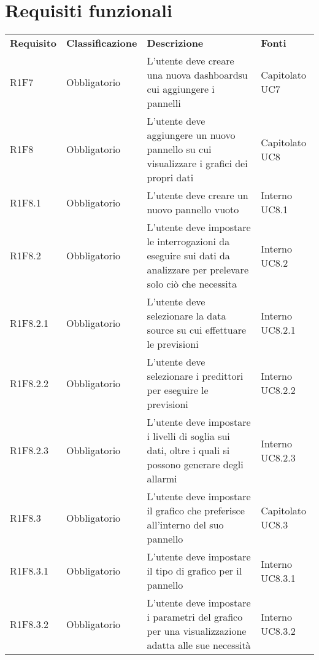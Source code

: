 \section{Requisiti funzionali}
\begin{longtable} {
		>{\centering}p{18mm} 
		>{\centering}p{28mm}
		>{}p{50mm} 
		>{}p{28mm}
	}
	\rowcolor{gray!50}

		\textbf{Requisito} & \textbf{Classificazione} & \textbf{Descrizione} & \textbf{Fonti} 	\TBstrut \\

		R1F7 & Obbligatorio & L'utente deve creare una nuova dashboard\glosp su cui aggiungere i pannelli & Capitolato UC7 \TBstrut \\ [2mm]

		R1F8 & Obbligatorio & L'utente deve aggiungere un nuovo pannello su cui visualizzare i grafici dei propri dati & Capitolato UC8 \TBstrut \\ [2mm]

		R1F8.1 & Obbligatorio & L'utente deve creare un nuovo pannello vuoto & Interno UC8.1 \TBstrut \\ [2mm]

		R1F8.2 & Obbligatorio & L'utente deve impostare le interrogazioni da eseguire sui dati da analizzare per prelevare solo ciò che necessita & Interno UC8.2 \TBstrut \\ [2mm]

		R1F8.2.1 & Obbligatorio & L'utente deve selezionare la data source su cui effettuare le previsioni & Interno UC8.2.1 \TBstrut \\ [2mm]

		R1F8.2.2 & Obbligatorio & L'utente deve selezionare i predittori per eseguire le previsioni & Interno UC8.2.2 \TBstrut \\ [2mm]

		R1F8.2.3 & Obbligatorio & L'utente deve impostare i livelli di soglia sui dati, oltre i quali si possono generare degli allarmi & Interno UC8.2.3 \TBstrut \\ [2mm]

		R1F8.3 & Obbligatorio & L'utente deve impostare il grafico che preferisce all'interno del suo pannello & Capitolato UC8.3 \TBstrut \\ [2mm]

		R1F8.3.1 & Obbligatorio & L'utente deve impostare il tipo di grafico per il pannello & Interno UC8.3.1 \TBstrut \\ [2mm]

		R1F8.3.2 & Obbligatorio & L'utente deve impostare i parametri del grafico per una visualizzazione adatta alle sue necessità & Interno UC8.3.2 \TBstrut \\ [2mm]


\end{longtable}
